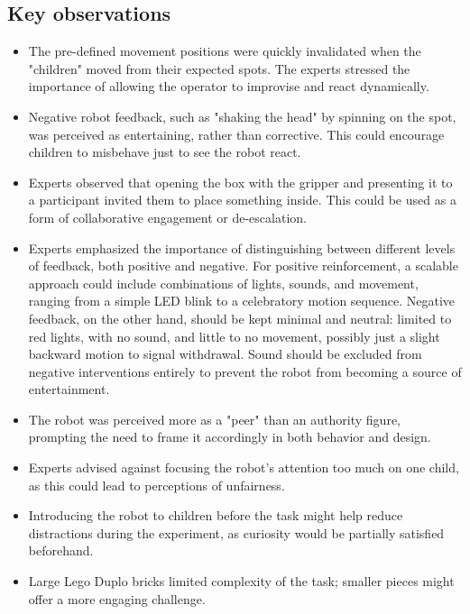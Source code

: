 \documentclass[a4paper]{usiinfbachelorproject}
\begin{document}
\subsection*{\textbf{Key observations}}
\begin{itemize}
    \item The pre-defined movement positions were quickly invalidated when the "children" moved from their expected spots. The experts stressed the importance of allowing the operator to improvise and react dynamically.
    \item Negative robot feedback, such as "shaking the head" by spinning on the spot, was perceived as entertaining, rather than corrective. This could encourage children to misbehave just to see the robot react.
    \item Experts observed that opening the box with the gripper and presenting it to a participant invited them to place something inside. This could be used as a form of collaborative engagement or de-escalation.
    \item Experts emphasized the importance of distinguishing between different levels of feedback, both positive and negative.
          For positive reinforcement, a scalable approach could include combinations of lights, sounds, and movement, ranging from a simple LED blink to a celebratory motion sequence.
          Negative feedback, on the other hand, should be kept minimal and neutral: limited to red lights, with no sound, and little to no movement, possibly just a slight backward motion to signal withdrawal.
          Sound should be excluded from negative interventions entirely to prevent the robot from becoming a source of entertainment.
    \item The robot was perceived more as a "peer" than an authority figure, prompting the need to frame it accordingly in both behavior and design.
    \item Experts advised against focusing the robot's attention too much on one child, as this could lead to perceptions of unfairness.
    \item Introducing the robot to children before the task might help reduce distractions during the experiment, as curiosity would be partially satisfied beforehand.
    \item Large Lego Duplo bricks limited complexity of the task; smaller pieces might offer a more engaging challenge.
\end{itemize}
\end{document}
